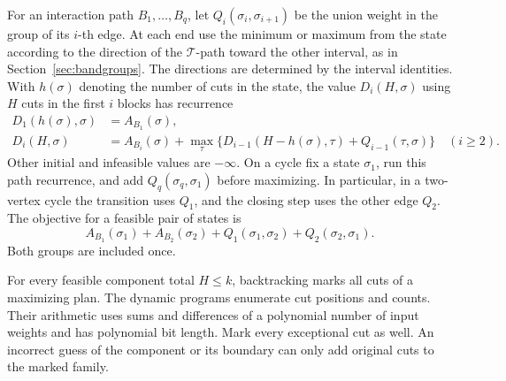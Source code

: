 \documentclass[10pt,letterpaper]{article}
\newcommand{\tree}{\mathcal T}
\begin{document}
For an interaction path \(B_1,\ldots,B_q\), let \(Q_i(\sigma_i,\sigma_{i+1})\) be the union weight in the group of its \(i\)-th edge. At each end use the minimum or maximum from the state according to the direction of the \(\tree\)-path toward the other interval, as in Section~\ref{sec:bandgroups}. The directions are determined by the interval identities. With \(h(\sigma)\) denoting the number of cuts in the state, the value \(D_i(H,\sigma)\) using \(H\) cuts in the first \(i\) blocks has recurrence
\[
\begin{aligned}
 D_1(h(\sigma),\sigma)&=A_{B_1}(\sigma),\\
 D_i(H,\sigma)&=A_{B_i}(\sigma)+
   \max_{\tau}\bigl\{D_{i-1}(H-h(\sigma),\tau)+Q_{i-1}(\tau,\sigma)\bigr\}
   \quad(i\ge2).
\end{aligned}
\]
Other initial and infeasible values are \(-\infty\). On a cycle fix a state \(\sigma_1\), run this path recurrence, and add \(Q_q(\sigma_q,\sigma_1)\) before maximizing. In particular, in a two-vertex cycle the transition uses \(Q_1\), and the closing step uses the other edge \(Q_2\). The objective for a feasible pair of states is
\[
   A_{B_1}(\sigma_1)+A_{B_2}(\sigma_2)
   +Q_1(\sigma_1,\sigma_2)+Q_2(\sigma_2,\sigma_1).
\]
Both groups are included once.

For every feasible component total \(H\le k\), backtracking marks all cuts of a maximizing plan. The dynamic programs enumerate cut positions and counts. Their arithmetic uses sums and differences of a polynomial number of input weights and has polynomial bit length. Mark every exceptional cut as well. An incorrect guess of the component or its boundary can only add original cuts to the marked family.
\end{document}
